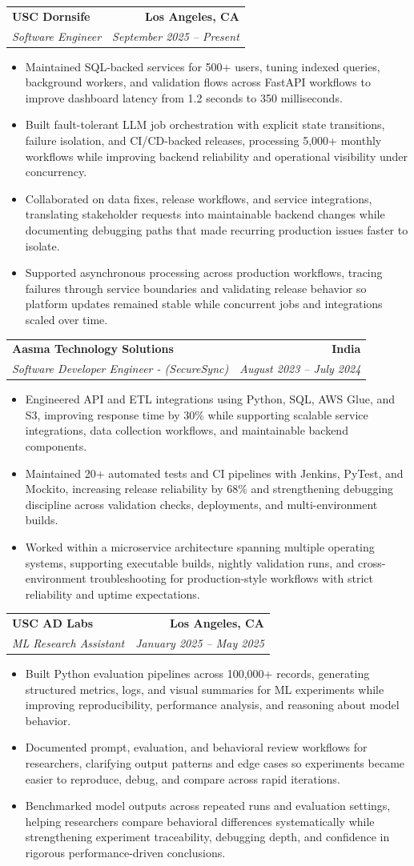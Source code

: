 \documentclass[letterpaper,10pt]{article}
\makeatletter
\newcommand{\resumeItem}[1]{\item\small{{#1 \vspace{-2pt}}}}
\newcommand{\resumeSubheading}[4]{\vspace{-1pt}\item\begin{tabular*}{1.0\textwidth}[t]{l@{\extracolsep{\fill}}r}\textbf{#1} & \textbf{\small #2} \\\textit{\small#3} & \textit{\small #4} \\\end{tabular*}\vspace{-2pt}}
\newcommand{\resumeItemListStart}{\begin{itemize}[leftmargin=0.15in,label=\textbullet,itemsep=2pt,topsep=0pt,parsep=0pt,partopsep=0pt]}
\newcommand{\resumeItemListEnd}{\end{itemize}\vspace{-4pt}}
\makeatother
\begin{document}
\resumeSubheading{USC Dornsife}{Los Angeles, CA}{Software Engineer}{September 2025 -- Present}
\resumeItemListStart
\resumeItem{Maintained SQL-backed services for 500+ users, tuning indexed queries, background workers, and validation flows across FastAPI workflows to improve dashboard latency from 1.2 seconds to 350 milliseconds.}
\resumeItem{Built fault-tolerant LLM job orchestration with explicit state transitions, failure isolation, and CI/CD-backed releases, processing 5,000+ monthly workflows while improving backend reliability and operational visibility under concurrency.}
\resumeItem{Collaborated on data fixes, release workflows, and service integrations, translating stakeholder requests into maintainable backend changes while documenting debugging paths that made recurring production issues faster to isolate.}
\resumeItem{Supported asynchronous processing across production workflows, tracing failures through service boundaries and validating release behavior so platform updates remained stable while concurrent jobs and integrations scaled over time.}
\resumeItemListEnd

\resumeSubheading{Aasma Technology Solutions}{India}{Software Developer Engineer - (SecureSync)}{August 2023 -- July 2024}
\resumeItemListStart
\resumeItem{Engineered API and ETL integrations using Python, SQL, AWS Glue, and S3, improving response time by 30\% while supporting scalable service integrations, data collection workflows, and maintainable backend components.}
\resumeItem{Maintained 20+ automated tests and CI pipelines with Jenkins, PyTest, and Mockito, increasing release reliability by 68\% and strengthening debugging discipline across validation checks, deployments, and multi-environment builds.}
\resumeItem{Worked within a microservice architecture spanning multiple operating systems, supporting executable builds, nightly validation runs, and cross-environment troubleshooting for production-style workflows with strict reliability and uptime expectations.}
\resumeItemListEnd

\resumeSubheading{USC AD Labs}{Los Angeles, CA}{ML Research Assistant}{January 2025 -- May 2025}
\resumeItemListStart
\resumeItem{Built Python evaluation pipelines across 100,000+ records, generating structured metrics, logs, and visual summaries for ML experiments while improving reproducibility, performance analysis, and reasoning about model behavior.}
\resumeItem{Documented prompt, evaluation, and behavioral review workflows for researchers, clarifying output patterns and edge cases so experiments became easier to reproduce, debug, and compare across rapid iterations.}
\resumeItem{Benchmarked model outputs across repeated runs and evaluation settings, helping researchers compare behavioral differences systematically while strengthening experiment traceability, debugging depth, and confidence in rigorous performance-driven conclusions.}
\resumeItemListEnd
\end{document}
